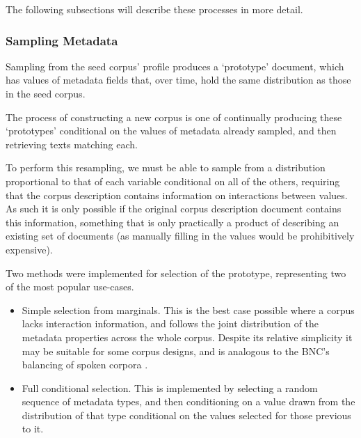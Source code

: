 The following subsections will describe these processes in more detail.

\subsubsection{Sampling Metadata}


Sampling from the seed corpus' profile produces a `prototype' document, which has values of metadata fields that, over time, hold the same distribution as those in the seed corpus.

The process of constructing a new corpus is one of continually producing these `prototypes' conditional on the values of metadata already sampled, and then retrieving texts matching each.

To perform this resampling, we must be able to sample from a distribution proportional to that of each variable conditional on all of the others, requiring that the corpus description contains information on interactions between values.  As such it is only possible if the original corpus description document contains this information, something that is only practically a product of describing an existing set of documents (as manually filling in the values would be prohibitively expensive).

Two methods were implemented for selection of the prototype, representing two of the most popular use-cases.  

\begin{itemize}
    \item Simple selection from marginals.  This is the best case possible where a corpus lacks interaction information, and follows the joint distribution of the metadata properties across the whole corpus.  Despite its relative simplicity it may be suitable for some corpus designs, and is analogous to the BNC's balancing of spoken corpora .
    \item Full conditional selection.  This is implemented by selecting a random sequence of metadata types, and then conditioning on a value drawn from the distribution of that type conditional on the values selected for those previous to it.
\end{itemize}

